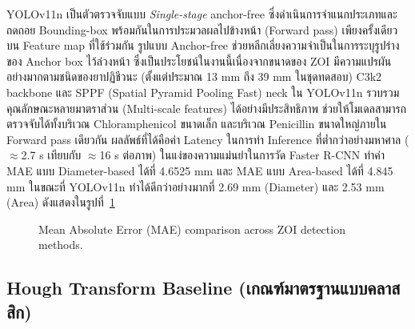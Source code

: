 YOLOv11n \cite{wang2024yolov11} เป็นตัวตรวจจับแบบ \emph{Single-stage} anchor-free
ซึ่งดำเนินการจำแนกประเภทและถดถอย Bounding-box พร้อมกันในการประมวลผลไปข้างหน้า (Forward pass) เพียงครั้งเดียวบน Feature map ที่ใช้ร่วมกัน
รูปแบบ Anchor-free ช่วยหลีกเลี่ยงความจำเป็นในการระบุรูปร่างของ Anchor box ไว้ล่วงหน้า ซึ่งเป็นประโยชน์ในงานนี้เนื่องจากขนาดของ ZOI มีความแปรผันอย่างมากตามชนิดของยาปฏิชีวนะ (ตั้งแต่ประมาณ 13 mm ถึง 39 mm ในชุดทดสอบ)
C3k2 backbone และ SPPF (Spatial Pyramid Pooling Fast) neck ใน YOLOv11n
รวบรวมคุณลักษณะหลายมาตราส่วน (Multi-scale features) ได้อย่างมีประสิทธิภาพ
ช่วยให้โมเดลสามารถตรวจจับได้ทั้งบริเวณ Chloramphenicol ขนาดเล็ก และบริเวณ Penicillin ขนาดใหญ่ภายใน Forward pass เดียวกัน
ผลลัพธ์ที่ได้คือค่า Latency ในการทำ Inference ที่ต่ำกว่าอย่างมหาศาล ($\approx$2.7 s เทียบกับ $\approx$16 s ต่อภาพ)
ในแง่ของความแม่นยำในการวัด Faster R-CNN ทำค่า MAE แบบ Diameter-based ได้ที่ 4.6525 mm
และ MAE แบบ Area-based ได้ที่ 4.845 mm ในขณะที่ YOLOv11n ทำได้ดีกว่าอย่างมากที่ 2.69 mm (Diameter) และ 2.53 mm (Area) ดังแสดงในรูปที่~\ref{fig:mae_bar}

\begin{figure}[H]
  \centering
  \caption[MAE comparison across ZOI detection methods]{Mean Absolute Error (MAE) comparison across ZOI detection methods.}
  \label{fig:mae_bar}
\end{figure}

\subsection{Hough Transform Baseline (เกณฑ์มาตรฐานแบบคลาสสิก)}

